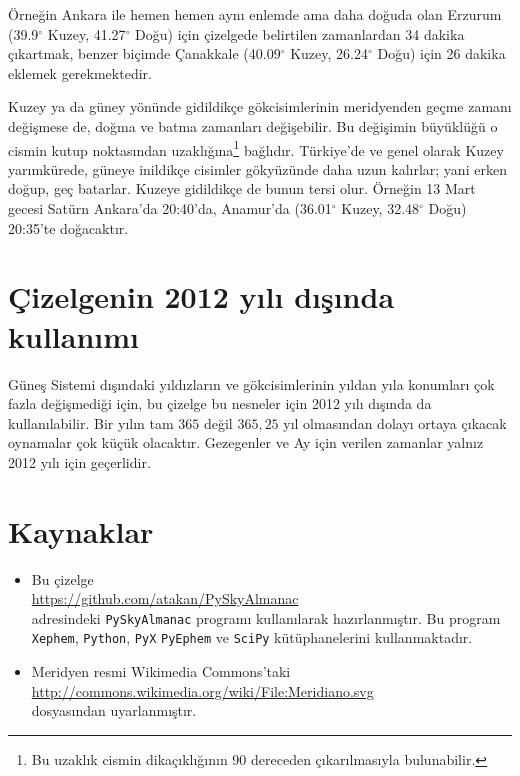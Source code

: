 \documentclass[12pt]{article}
\begin{document}
Örneğin Ankara ile hemen hemen aynı enlemde ama daha doğuda olan
Erzurum (39.9$^\circ$ Kuzey,  41.27$^\circ$ Doğu) için çizelgede
belirtilen zamanlardan 34 dakika çıkartmak, benzer bi\-çimde
Çanakkale (40.09$^\circ$ Kuzey,  26.24$^\circ$ Doğu) için 26 dakika
eklemek gerekmektedir.

Kuzey ya da güney yönünde gidildikçe gökcisimlerinin
meridyenden geçme zamanı değişmese de, doğma ve batma
zamanları değişebilir. Bu değişimin büyüklüğü o cismin
kutup noktasından uzaklığına\footnote{Bu uzaklık cismin
dikaçıklığının 90 dereceden çıkarılmasıyla bulunabilir.}
bağlıdır. Türkiye'de ve genel olarak Kuzey yarımkürede,
güneye inildikçe cisimler gök\-yü\-zün\-de daha uzun kalırlar;
yani erken doğup, geç batarlar. Kuzeye gidildikçe de bunun tersi
olur. Örneğin 13 Mart gecesi Satürn Ankara'da 20:40'da, Anamur'da
(36.01$^\circ$ Kuzey, 32.48$^\circ$ Doğu) 20:35'te doğacaktır.

\section{Çizelgenin 2012 yılı dışında kullanımı}
Güneş Sistemi dışındaki yıldızların ve gökcisimlerinin yıldan yıla
konumları çok fazla de\-ğiş\-me\-di\-ği için, bu çizelge bu nesneler için 2012
yılı dışında da kullanılabilir. Bir yılın tam $365$ değil $365,25$ yıl
olmasından dolayı ortaya çıkacak oynamalar çok küçük olacaktır.
Gezegenler ve Ay için verilen zamanlar yalnız  2012 yılı için
geçerlidir.

\section*{Kaynaklar}
\begin{itemize}
\item Bu çizelge\\
\url{https://github.com/atakan/PySkyAlmanac}\\
adresindeki \texttt{PySkyAlmanac} programı kullanılarak hazırlanmıştır.
Bu program\\
\texttt{Xephem}, \texttt{Python}, \texttt{PyX}
\texttt{PyEphem} ve \texttt{SciPy} kütüphanelerini kullanmaktadır.
\item Meridyen resmi Wikimedia Commons'taki\\
\url{http://commons.wikimedia.org/wiki/File:Meridiano.svg}\\
dosyasından uyarlanmıştır.
\end{itemize}
\end{document}
